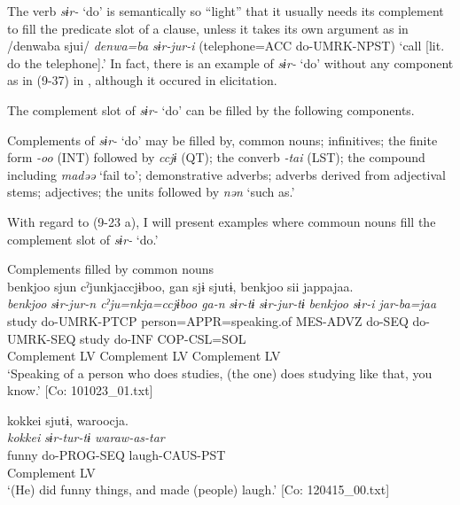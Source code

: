 The verb \textit{sɨr-} ‘do’ is semantically so “light” that it usually needs its complement to fill the predicate slot of a clause, unless it takes its own argument as in /denwaba sjui/ \textit{denwa=ba} \textit{sɨr-jur-i} (telephone=ACC do-UMRK-NPST) ‘call [lit. do the telephone].’ In fact, there is an example of \textit{sɨr-} ‘do’ without any component as in (9-37) in , although it occured in elicitation.

The complement slot of \textit{sɨr-} ‘do’ can be filled by the following components.

\ea  Complements of \textit{sɨr-} ‘do’ may be filled by, \label{ex:9.23}
  \ea  common nouns;
  \ex  infinitives;
  \ex  the finite form \textit{{}-oo} (INT) followed by \textit{ccjɨ} (QT);
  \ex  the converb \textit{{}-tai} (LST);
  \ex  the compound including \textit{madəə} ‘fail to’;
  \ex  demonstrative adverbs;
  \ex  adverbs derived from adjectival stems;
  \ex  adjectives;
  \ex  the units followed by \textit{nən} ‘such as.’
  \z
\z

With regard to (9-23 a), I will present examples where commoun nouns fill the complement slot of \textit{sɨr-} ‘do.’

\ea   Complements filled by common nouns \label{ex:9.24}
\ea{}\\
 \gllll    {\textbar}benkjoo{\textbar}  sjun  cˀjunkjaccjɨboo,  gan  sjɨ  sjutɨ,  {\textbar}benkjoo{\textbar}  sii  jappajaa.\\
      \textit{benkjoo}  \textit{sɨr{}-jur-n  cˀju=nkja=ccjɨboo  ga-n}   \textit{sɨr-tɨ}  \textit{sɨr-jur-tɨ}  \textit{benkjoo}  \textit{sɨr{}-i  jar-ba=jaa}\\
      study  do-UMRK-PTCP  person=APPR=speaking.of  MES-ADVZ  do-SEQ  do-UMRK-SEQ  study  do-INF  COP-CSL=SOL\\
      Complement  LV    Complement                            LV    Complement  LV  \\
      \glt       ‘Speaking of a person who does studies, (the one) does studying like that, you know.’ [Co: 101023\_01.txt]

\ex %
\gllll   {\textbar}kokkei{\textbar}  sjutɨ,  waroocja.\\
      \textit{kokkei}  \textit{sɨr{}-tur-tɨ  waraw-as-tar}\\
      funny  do-PROG-SEQ  laugh-CAUS-PST\\
      Complement  LV  \\
      \glt       ‘(He) did funny things, and made (people) laugh.’ [Co: 120415\_00.txt]

